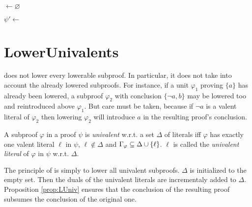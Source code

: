 \documentclass{llncs}
\begin{document}
\begin{algorithm}[bt]
  \BlankLine

  \Units $\leftarrow \varnothing$ \;
  \BlankLine

  \BlankLine

  $\psi' \leftarrow $ \Rec{$\psi$,$\Units$} \;
  \BlankLine


  \caption{\LowerUnits}
  \label{algo:LU}
\end{algorithm}




\section{LowerUnivalents} \label{sec:LUniv}

{\LowerUnits} does not lower every lowerable subproof. In particular, it does not take into
account the already lowered subproofs. For instance, if a unit $\varphi_1$ proving $\{a\}$ has
already been lowered, a subproof $\varphi_2$ with conclusion $\{\neg a,b\}$ may be lowered too and
reintroduced above $\varphi_1$. But care must be taken, because if $\neg a$ is a valent literal of
$\varphi_2$ then lowering $\varphi_2$ will introduce $a$ in the resulting proof's conclusion.

\begin{definition}
A subproof $\varphi$ in a proof $\psi$ is \emph{univalent} w.r.t. a set $\Delta$ of literals iff
$\varphi$ has exactly one valent literal $\ell$ in $\psi$, $\ell \notin \Delta$ and
$\Gamma_{\varphi} \subseteq \Delta \cup \left\{ \ell \right\}$. $\ell$ is called the \emph{univalent
literal} of $\varphi$ in $\psi$ w.r.t.  $\Delta$.
\end{definition}

The principle of {\LowerUnivalents} is simply to lower all univalent subproofs. $\Delta$ is
initialized to the empty set. Then the duals of the univalent literals are incrementaly added to
$\Delta$. Proposition \ref{prop:LUniv} ensures that the conclusion of the resulting proof
subsumes the conclusion of the original one.
\end{document}
